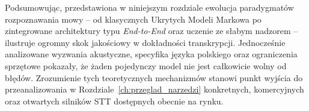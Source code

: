 Podsumowując, przedstawiona w niniejszym rozdziale ewolucja paradygmatów rozpoznawania mowy -- od klasycznych Ukrytych Modeli Markowa po zintegrowane architektury typu \textit{End-to-End} oraz uczenie ze słabym nadzorem -- ilustruje ogromny skok jakościowy w dokładności transkrypcji. Jednocześnie analizowane wyzwania akustyczne, specyfika języka polskiego oraz ograniczenia sprzętowe pokazały, że żaden pojedynczy model nie jest całkowicie wolny od błędów. Zrozumienie tych teoretycznych mechanizmów stanowi punkt wyjścia do przeanalizowania w Rozdziale~\ref{ch:przeglad_narzedzi} konkretnych, komercyjnych oraz otwartych silników STT dostępnych obecnie na rynku.
